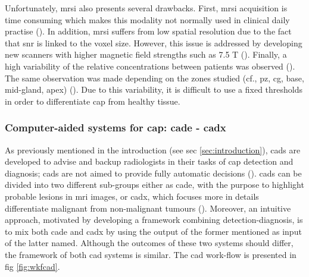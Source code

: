 \begin{enumerate}[leftmargin=*]
Unfortunately, \ac{mrsi} also presents several drawbacks. First, \ac{mrsi} acquisition is time consuming which makes this modality not normally used in clinical daily practise (\cite{Barentsz2012}). In addition, \ac{mrsi} suffers from low spatial resolution due to the fact that \ac{snr} is linked to the voxel size. However, this issue is addressed by developing new scanners with higher magnetic field strengths such as 7.5 T (\cite{Giskeodegard2013}). Finally, a high variability of the relative concentrations between patients was observed (\cite{Choi2007}). The same observation was made depending on the zones studied (cf., \ac{pz}, \ac{cg}, base, mid-gland, apex) (\cite{Walker2010,Lemaitre2011}). Due to this variability, it is difficult to use a fixed thresholds in order to differentiate \ac{cap} from healthy tissue.

\end{enumerate}

\subsubsection{Computer-aided systems for \ac{cap}: \ac{cade} - \ac{cadx}} \label{subsubsec:CAD}

As previously mentioned in the introduction (see \acs{sec} \ref{sec:introduction}), \acp{cad} are developed to advise and backup radiologists in their tasks of \ac{cap} detection and diagnosis; \acp{cad} are not aimed to provide fully automatic decisions (\cite{Giger2008}). \acp{cad} can be divided into two different sub-groups either as \ac{cade}, with the purpose to highlight probable lesions in \ac{mri} images, or \ac{cadx}, which focuses more in details differentiate malignant from non-malignant tumours (\cite{Giger2008}). Moreover, an intuitive approach, motivated by developing a framework combining detection-diagnosis, is to mix both \ac{cade} and \ac{cadx} by using the output of the former mentioned as input of the latter named. Although the outcomes of these two systems should differ, the framework of both \ac{cad} systems is similar. The \ac{cad} work-flow is presented in \acs{fig} \ref{fig:wkfcad}.


